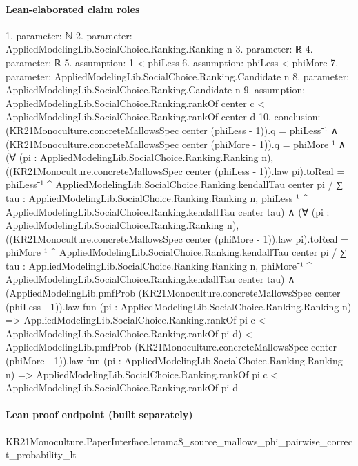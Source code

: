 \documentclass[10pt]{article}
\begin{document}
\paragraph{Lean-elaborated claim roles}\begin{ReviewVerbatim}
1. parameter: ℕ
2. parameter: AppliedModelingLib.SocialChoice.Ranking.Ranking n
3. parameter: ℝ
4. parameter: ℝ
5. assumption: 1 < phiLess
6. assumption: phiLess < phiMore
7. parameter: AppliedModelingLib.SocialChoice.Ranking.Candidate n
8. parameter: AppliedModelingLib.SocialChoice.Ranking.Candidate n
9. assumption: AppliedModelingLib.SocialChoice.Ranking.rankOf center c < AppliedModelingLib.SocialChoice.Ranking.rankOf center d
10. conclusion: (KR21Monoculture.concreteMallowsSpec center (phiLess - 1)).q = phiLess⁻¹ ∧
  (KR21Monoculture.concreteMallowsSpec center (phiMore - 1)).q = phiMore⁻¹ ∧
    (∀ (pi : AppliedModelingLib.SocialChoice.Ranking.Ranking n),
        ((KR21Monoculture.concreteMallowsSpec center (phiLess - 1)).law pi).toReal =
          phiLess⁻¹ ^ AppliedModelingLib.SocialChoice.Ranking.kendallTau center pi /
            ∑ tau : AppliedModelingLib.SocialChoice.Ranking.Ranking n,
              phiLess⁻¹ ^ AppliedModelingLib.SocialChoice.Ranking.kendallTau center tau) ∧
      (∀ (pi : AppliedModelingLib.SocialChoice.Ranking.Ranking n),
          ((KR21Monoculture.concreteMallowsSpec center (phiMore - 1)).law pi).toReal =
            phiMore⁻¹ ^ AppliedModelingLib.SocialChoice.Ranking.kendallTau center pi /
              ∑ tau : AppliedModelingLib.SocialChoice.Ranking.Ranking n,
                phiMore⁻¹ ^ AppliedModelingLib.SocialChoice.Ranking.kendallTau center tau) ∧
        (AppliedModelingLib.pmfProb (KR21Monoculture.concreteMallowsSpec center (phiLess - 1)).law
            fun (pi : AppliedModelingLib.SocialChoice.Ranking.Ranking n) =>
            AppliedModelingLib.SocialChoice.Ranking.rankOf pi c < AppliedModelingLib.SocialChoice.Ranking.rankOf pi d) <
          AppliedModelingLib.pmfProb (KR21Monoculture.concreteMallowsSpec center (phiMore - 1)).law
            fun (pi : AppliedModelingLib.SocialChoice.Ranking.Ranking n) =>
            AppliedModelingLib.SocialChoice.Ranking.rankOf pi c < AppliedModelingLib.SocialChoice.Ranking.rankOf pi d
\end{ReviewVerbatim}

\paragraph{Lean proof endpoint (built separately)}\begin{ReviewVerbatim}
KR21Monoculture.PaperInterface.lemma8_source_mallows_phi_pairwise_correct_probability_lt
\end{ReviewVerbatim}
\end{document}

